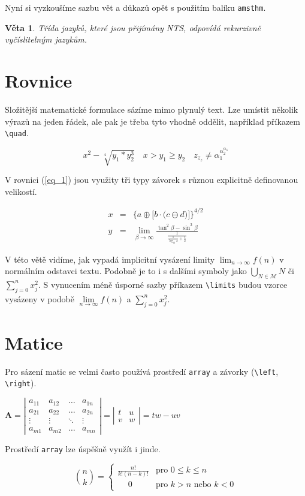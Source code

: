 \documentclass[a4paper, 11pt, twocolumn]{article}
\theoremstyle{plain}
\theoremstyle{plain}
\newtheorem{sentence}{Věta}
\begin{document}
    Nyní si vyzkoušíme sazbu vět a důkazů opět s použitím balíku \texttt{amsthm}.
    \begin{sentence}
        Třída jazyků, které jsou přijímány NTS, odpovídá {\normalfont rekurzivně vyčíslitelným jazykům}.
    \end{sentence}
    
    \section{Rovnice}
    Složitější matematické formulace sázíme mimo plynulý text. Lze umístit několik výrazů na jeden řádek, ale pak je třeba tyto vhodně oddělit, například příkazem \verb|\quad|.

    $$x^2-\sqrt[4]{y_1*y_2^3}\quad x > y_1 \geq y_2\quad z_{z_z} \neq \alpha_1^{\alpha_2^{\alpha_3}}$$
    
    V rovnici (\ref{eq_1}) jsou využity tři typy závorek s různou explicitně definovanou velikostí.
    
    \begin{eqnarray}
		\label{eq_1} 
		x & = & \bigg\{a \oplus \Big[b \cdot \big(c \ominus d \big) \Big] \bigg\}^{4/2} \\ 
		\label{eq_2} 
		y & = & \lim_{\beta\to\infty} \frac{\tan^2\beta - \sin^3\beta}{\frac{1}{\frac{1}{\log_{42}x}+\frac{1}{2}}}
	\end{eqnarray}
	
	V této větě vidíme, jak vypadá implicitní vysázení limity $\lim_{n \to \infty} f(n)$ v normálním odstavci textu. Podobně je to i s dalšími symboly jako $\bigcup_{N\in\mathcal{M}}N$ či $\sum_{j=0}^n x_j^2$. S vynucením méně úsporné sazby příkazem \verb|\limits| budou vzorce vysázeny v podobě $ \lim\limits_{n\to\infty} f(n)$ a $\sum\limits_{j=0}^n x_j^2$.

    \section{Matice}
    Pro sázení matic se velmi často používá prostředí \texttt{array} a závorky (\verb|\left|, \verb|\right|).
    \begin{flushleft}
    \bigskip
    $
		\mathbf{A} =
		\left|
		\begin{array}{cccc}
			a_{11} & a_{12} & \ldots & a_{1n} \\
			a_{21} & a_{22} & \ldots & a_{2n} \\
			\vdots & \vdots & \ddots & \vdots \\
			a_{m1} & a_{m2} & \ldots & a_{mn}
		\end{array}
		\right|=
		\left|
		\begin{array}{cc}
			t & u \\
			v & w
		\end{array}
		\right|= tw - uv
	$
	\end{flushleft}
	
	Prostředí \texttt{array} lze úspěšně využít i jinde.
	
	$$
		\binom{n}{k} =
		\left\{
		\begin{array}{ll}
			\frac{n!}{k!(n - k)!} & \text{pro } 0 \leq k \leq n \\ \quad\; 0 & \text{pro } k > n \text{ nebo } k < 0
		\end{array}
		\right.
	$$
	
\end{document}
